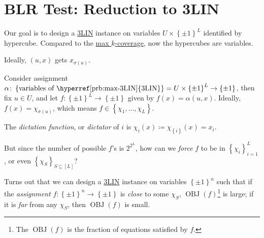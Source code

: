 \section{BLR Test: Reduction to 3LIN}
Our goal is to design a \hyperref[prb:max-3LIN]{3LIN} instance on variables \(U \times \left\{ \pm 1 \right\} ^L\) identified by hypercube. Compared to the \hyperref[prb:max-k-coverage]{max \(k\)-coverage}, now the hypercubes are variables.
\begin{center}
\end{center}

Ideally, \((u, x)\) gets \(x_{\sigma (u)}\).

\begin{intuition}
	Consider assignment \(\alpha \colon \left\{ \text{variables of \hyperref[prb:max-3LIN]{3LIN}}\right\} = U \times \left\{ \pm 1 \right\}^L \to \left\{ \pm 1 \right\} \), then fix \(u\in U\), and let \(f\colon \left\{ \pm 1 \right\} ^L \to  \left\{ \pm 1 \right\} \) given by \(f(x) = \alpha (u, x)\). Ideally, \(f(x) = \chi _{\sigma (u)}\), which means \(f\in \left\{ \chi _1, \ldots , \chi _L  \right\} \).
\end{intuition}

\begin{notation}[Dictation]\label{not:dictation}
	The \emph{dictation function}, or \emph{dictator} of \(i\) is \(\chi _i(x) \coloneqq \chi _{\left\{ i \right\} } (x) = x_i\).
\end{notation}

\begin{problem*}
	But since the number of possible \(f\)'s is \(2^{2^L}\), how can we \emph{force} \(f\) to be in \(\left\{ \chi _i \right\}_{i = 1}^L\), or even \(\left\{ \chi _S \right\}_{S \subseteq [L]} \)?
\end{problem*}
\begin{answer}
	Turns out that we can design a \hyperref[prb:max-3LIN]{3LIN} instance on variables \(\left\{ \pm 1 \right\} ^n\) such that if the \emph{assignment} \(f\colon \left\{ \pm 1 \right\} ^n \to  \left\{ \pm 1 \right\} \) is \emph{close} to some \(\chi _S\), \(\mathop{\mathrm{OBJ}}(f)\)\footnote{The \(\mathop{\mathrm{OBJ}}(f)\) is the fraction of equations satisfied by \(f\).} is large; if it is \emph{far} from any \(\chi _S\), then \(\mathop{\mathrm{OBJ}}(f)\) is small.
\end{answer}